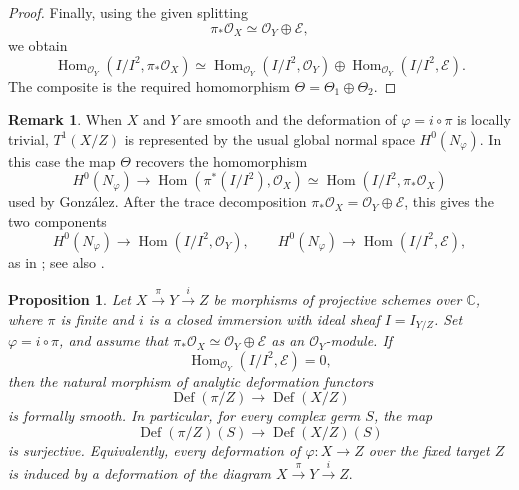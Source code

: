 \documentclass[11pt,twoside]{amsart}
\theoremstyle{plain}
\numberwithin{equation}{section}
\newtheorem{proposition}[theorem]{Proposition}
\theoremstyle{definition}
\newtheorem{remark}[theorem]{Remark}
\begin{document}
\begin{proof}
Finally, using the given splitting
\[
    \pi_*\mathcal O_X\simeq \mathcal O_Y\oplus \mathcal E,
\]
we obtain
\[
    \operatorname{Hom}_{\mathcal O_Y}(I/I^2,\pi_*\mathcal O_X)
    \simeq
    \operatorname{Hom}_{\mathcal O_Y}(I/I^2,\mathcal O_Y)
    \oplus
    \operatorname{Hom}_{\mathcal O_Y}(I/I^2,\mathcal E).
\]
The composite is the required homomorphism \(\Theta=\Theta_1\oplus\Theta_2\).
\end{proof}

\begin{remark}
When \(X\) and \(Y\) are smooth and the deformation of \(\varphi=i\circ\pi\) is
locally trivial, \(T^1(X/Z)\) is represented by the usual global normal space
\(H^0(N_\varphi)\). In this case the map \(\Theta\) recovers the homomorphism
\[
    H^0(N_\varphi)
    \longrightarrow
    \operatorname{Hom}(\pi^*(I/I^2),\mathcal O_X)
    \simeq
    \operatorname{Hom}(I/I^2,\pi_*\mathcal O_X)
\]
used by Gonz\'alez. After the trace decomposition
\(\pi_*\mathcal O_X=\mathcal O_Y\oplus\mathcal E\), this gives the two components
\[
    H^0(N_\varphi)\to \operatorname{Hom}(I/I^2,\mathcal O_Y),
    \qquad
    H^0(N_\varphi)\to \operatorname{Hom}(I/I^2,\mathcal E),
\]
as in \cite[Proposition~3.7]{Gonzalez2005}; see also
\cite[Proposition~1.2]{GallegoGonzalezPurnaprajna2010}.
\end{remark}

\begin{proposition}\label{prop:smoothness-deformations-fixed-target}
Let
$
X\xrightarrow{\pi}Y\xrightarrow{i}Z
$
be morphisms of projective schemes over $\mathbb C$, where $\pi$ is finite and $i$ is a closed immersion with ideal sheaf $I=I_{Y/Z}$. Set $\varphi=i\circ\pi$, and assume that
$
\pi_*\mathcal O_X\simeq\mathcal O_Y\oplus\mathcal E
$
as an $\mathcal O_Y$-module. If
$$
\operatorname{Hom}_{\mathcal O_Y}(I/I^2,\mathcal E)=0,
$$
then the natural morphism of analytic deformation functors
$$
\operatorname{Def}(\pi/Z)\longrightarrow\operatorname{Def}(X/Z)
$$
is formally smooth. In particular, for every complex germ $S$, the map
$$
\operatorname{Def}(\pi/Z)(S)\longrightarrow\operatorname{Def}(X/Z)(S)
$$
is surjective. Equivalently, every deformation of $\varphi:X\to Z$ over the fixed target $Z$ is induced by a deformation of the diagram
$
X\xrightarrow{\pi}Y\xrightarrow{i}Z.
$
\end{proposition}
\end{document}
